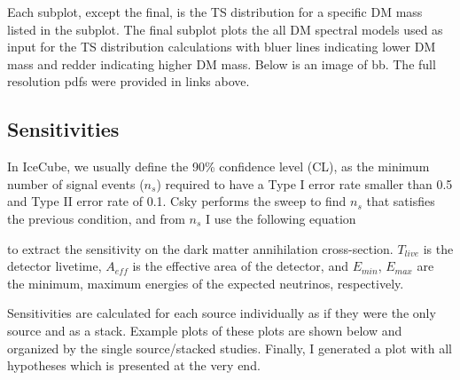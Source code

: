 Each subplot, except the final, is the TS distribution for a specific DM mass listed in the subplot. The final subplot plots the all DM spectral models used as input for the TS distribution calculations with bluer lines indicating lower DM mass and redder indicating higher DM mass.
Below is an image of bb. The full resolution pdfs were provided in links above.

%

\subsection{Sensitivities} \label{sec:icDM_sensitivity}

In IceCube, we usually define the 90\% confidence level (CL), as the minimum number of signal events ($n_s$) required to have a Type I error rate smaller than 0.5 and Type II error rate of 0.1.
Csky performs the sweep to find $n_s$ that satisfies the previous condition, and from $n_s$ I use the following equation
%

to extract the sensitivity on the dark matter annihilation cross-section.
$ T_{live} $ is the detector livetime, $ A_{eff} $ is the effective area of the detector, and $ E_{min} $, $ E_{max} $ are the minimum, maximum energies of the expected neutrinos, respectively.

Sensitivities are calculated for each source individually as if they were the only source and as a stack.
Example plots of these plots are shown below and organized by the single source/stacked studies.
Finally, I generated a plot with all hypotheses which is presented at the very end.


